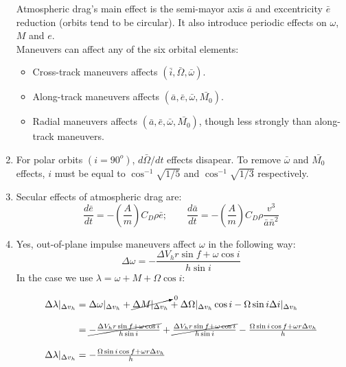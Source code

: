 \documentclass[a4paper]{article}
\begin{document}
\begin{enumerate}[label=\emph{\alph*)}]
    Atmospheric drag's main effect is the semi-mayor axis $\bar{a}$  and excentricity $\bar{e}$ reduction (orbits tend to be circular). It also introduce periodic effects on $\omega$, $M$ and $e$.\\
    Maneuvers can affect any of the six orbital elements:
    \begin{itemize}
      \item Cross-track maneuvers affects $(\bar{i},\bar{\Omega},\bar{\omega})$.
      \item Along-track maneuvers affects $(\bar{a},\bar{e},\bar{\omega},\bar{M_0})$.
      \item Radial maneuvers affects $(\bar{a},\bar{e},\bar{\omega},\bar{M_0})$, though less strongly than along-track maneuvers.
    \end{itemize}

  \item %
    For polar orbits $(i=90^o)$, $d\bar{\Omega} / dt$ effects disapear. To remove $\bar{\omega}$ and $\bar{M_0}$ effects, $i$ must be equal to $\cos^{-1}{\sqrt{1/5}}$ and $\cos^{-1}{\sqrt{1/3}}$ respectively.
 
  \item %
    Secular effects of atmospheric drag are:
    \[ \frac{d\bar{e}}{dt} = -\left(\frac{A}{m} \right) C_D \rho \bar{e}; \qquad  \frac{d\bar{a}}{dt} = -\left(\frac{A}{m} \right) C_D \rho \frac{v^3}{\bar{a}\bar{n}^2} \]

  \item %
    Yes, out-of-plane impulse maneuvers affect $\omega$ in the following way:
    \[\Delta\omega = -\frac{\Delta V_h r \sin{f+\omega}\cos{i}}{h\sin{i}} \]
    In the case we use $\lambda = \omega+M+\Omega\cos{i}$:
    \[\arraycolsep=1.4pt\def\arraystretch{2.2}
    \begin{array}{c c l} \Delta\lambda|_{\Delta v_h} &=& \Delta \omega|_{\Delta v_h} + \cancelto{0}{\Delta M|_{\Delta v_h}} + \Delta \Omega|_{\Delta v_h} \cos{i} - \Omega \sin{i} \Delta i|_{\Delta v_h} \\
	&=& \cancel{-\frac{\Delta V_h r \sin{f+\omega}\cos{i}}{h\sin{i}}}+ \cancel{\frac{\Delta V_h r \sin{f+\omega}\cos{i}}{h\sin{i}} } - \frac{\Omega \sin{i}\cos{f+\omega}r\Delta v_h}{h}  \\
    \Delta\lambda|_{\Delta v_h} &=& - \frac{\Omega \sin{i}\cos{f+\omega}r\Delta v_h}{h} \end{array}\] 


\end{enumerate}
\end{document}
